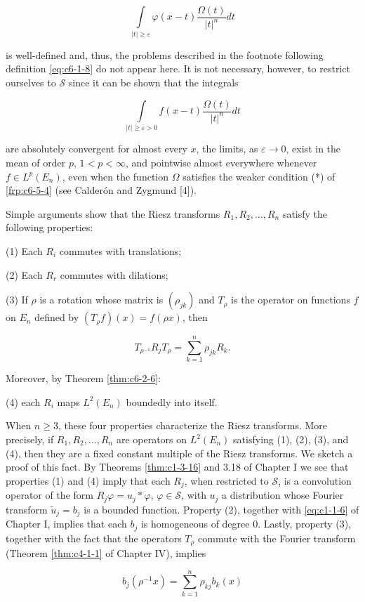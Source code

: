 \[
\int\limits_{|t|\ge\varepsilon}\varphi(x-t)\frac{\Omega(t)}{|t|^{n}}dt
\]

is well-defined and, thus, the problems described in the footnote following definition \eqref{eq:c6-1-8} do not appear here. It is not necessary, however, to restrict ourselves to $\mathcal{S}$ since it can be shown that the integrals

\[
\int\limits_{|t|\geq\varepsilon>0}f(x-t)\frac{\Omega(t)}{|t|^{n}}dt
\]

are absolutely convergent for almost every $x$, the limits, as $\varepsilon \to 0$, exist in the mean of order $p$, $1 < p < \infty$, and pointwise almost everywhere whenever $f \in L^p(E_n)$, even when the function $\Omega$ satisfies the weaker condition (*) of \eqref{frp:c6-5-4} (see Calderón and Zygmund [4]).

 Simple arguments show that the Riesz transforms $R_1, R_2, \ldots, R_n$ satisfy the following properties:

(1) Each $R_{i}$ commutes with translations;

(2) Each $R_{r}$ commutes with dilations;

(3) If $\rho$ is a rotation whose matrix is $(\rho_{jk})$ and $T_\rho$ is the operator on functions $f$ on $E_n$ defined by $(T_\rho f)(x) = f(\rho x)$, then

\[
T_{\rho^{-1}}R_{j}T_{\rho}=\sum_{k=1}^{n}\rho_{j k}R_{k}.
\]

Moreover, by Theorem \ref{thm:c6-2-6}:

(4) each $R_{i}$ maps $L^{2}(E_{n})$ boundedly into itself.

When $n \geq 3$, these four properties characterize the Riesz transforms. More precisely, if $R_1, R_2, \ldots, R_n$ are operators on $L^2(E_n)$ satisfying (1), (2), (3), and (4), then they are a fixed constant multiple of the Riesz transforms. We sketch a proof of this fact. By Theorems \ref{thm:c1-3-16} and 3.18 of Chapter I we see that properties (1) and (4) imply that each $R_j$, when restricted to $\mathcal{S}$, is a convolution operator of the form $R_j \varphi = u_j * \varphi$, $\varphi \in \mathcal{S}$, with $u_j$ a distribution whose Fourier transform $\tilde{u}_j = b_j$ is a bounded function. Property (2), together with \eqref{eq:c1-1-6} of Chapter I, implies that each $b_j$ is homogeneous of degree 0. Lastly, property (3), together with the fact that the operators $T_\rho$ commute with the Fourier transform (Theorem \ref{thm:c4-1-1} of Chapter IV), implies

\[
b_{j}(\rho^{-1}x)=\sum_{k=1}^{n}\rho_{k j}b_{k}(x)
\]

